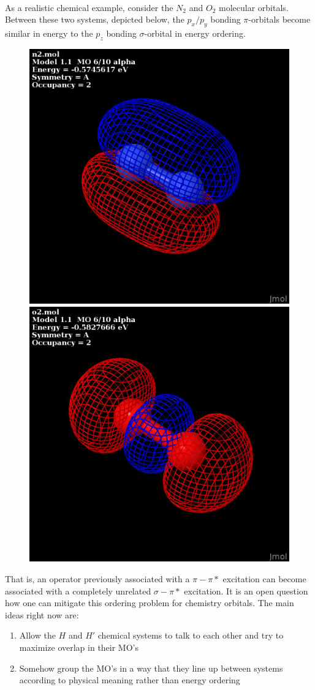 \documentclass{article}
\begin{document}
\paragraph*{}
As a realistic chemical example, consider the $N_2$ and $O_2$ molecular orbitals.  Between these two systems, depicted below, the $p_x/p_y$ bonding $\pi$-orbitals become similar in energy to the $p_z$ bonding $\sigma$-orbital in energy ordering.  
\begin{figure}[h!]
\includegraphics[width = .5\textwidth]{n2.jpg}
\includegraphics[width = .5\textwidth]{o2.jpg}
\end{figure}
That is, an operator previously associated with a $\pi-\pi*$ excitation can become associated with a completely unrelated $\sigma-\pi*$ excitation.  It is an open question how one can mitigate this ordering problem for chemistry orbitals.  The main ideas right now are:
\begin{enumerate}
\item Allow the $H$ and $H'$ chemical systems to talk to each other and try to maximize overlap in their MO's
\item Somehow group the MO's in a way that they line up between systems according to physical meaning rather than energy ordering
\end{enumerate}
\end{document}

